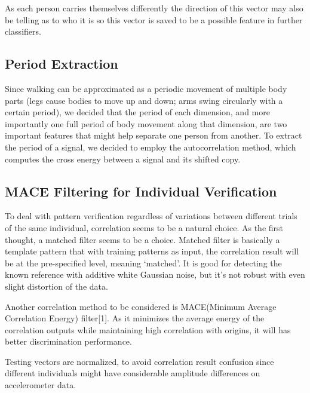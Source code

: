 \documentclass[10pt,twocolumn,letterpaper]{article}
\begin{document}
\begin{figure}[t]
\begin{center}
\fbox{\rule{0pt}{2in} \rule{0.9\linewidth}{0pt}}
   \caption{}
\end{center}
\end{figure}

As each person carries themselves differently the direction of this vector may also be telling as to who it is so this vector is saved to be a possible feature in further classifiers.

\subsection{Period Extraction}
Since walking can be approximated as a periodic movement of multiple body parts (legs cause bodies to move up and down; arms swing circularly with a certain period), we decided that the period of each dimension, and more importantly one full period of body movement along that dimension, are two important features that might help separate one person from another. To extract the period of a signal, we decided to employ the autocorrelation method, which computes the cross energy between a signal and its shifted copy.  

\subsection{MACE Filtering for Individual Verification}
To deal with pattern verification regardless of variations between different trials of the same individual, correlation seems to be a natural choice. As the first thought, a matched filter seems to be a choice. Matched filter is basically a template pattern that with training patterns as input, the correlation result will be at the pre-specified level, meaning ‘matched’. It is good for detecting the known reference with additive white Gaussian noise, but it’s not robust with even slight distortion of the data. 

Another correlation method to be considered is MACE(Minimum Average Correlation Energy) filter[1]. As it minimizes the average energy of the correlation outputs while maintaining high correlation with origins, it will has better discrimination performance. 

Testing vectors are normalized, to avoid correlation result confusion since different individuals might have considerable amplitude differences on accelerometer data.
\end{document}
